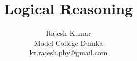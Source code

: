 \documentclass{beamer}
\begin{document}
\title{Logical Reasoning}
\author{Rajesh Kumar \\Model College Dumka\\kr.rajesh.phy@gmail.com}
\date{}

\begin{frame}
  \titlepage
\end{frame}








\end{document}
